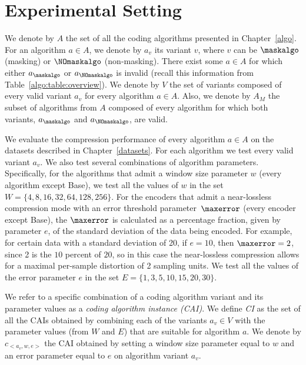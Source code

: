 
\clearpage
\section{Experimental Setting}
\label{experiments:experiments}


We denote by $A$ the set of all the coding algorithms presented in Chapter~\ref{algo}. For an algorithm $a \in A$, we denote by $a_v$ its variant $v$, where $v$ can be $\maskalgo$ (masking) or $\NOmaskalgo$ (non-masking). There exist some $a \in A$ for which either $a_\maskalgo$ or $a_\NOmaskalgo$ is invalid (recall this information from Table~\ref{algo:table:overview}). We denote by $V$ the set of variants composed of every valid variant $a_v$ for every algorithm $a \in A$. 
Also, we denote by $A_M$ the subset of algorithms from $A$ composed of every algorithm for which both variants, $a_\maskalgo$ and $a_\NOmaskalgo$, are valid.


We evaluate the compression performance of every algorithm $a \in A$ on the datasets described in Chapter~\ref{datasets}. For each algorithm we test every valid variant $a_v$. We also test several combinations of algorithm parameters. Specifically, for the algorithms that admit a window size parameter $w$ (every algorithm except Base), we test all the values of $w$ in the set $W = \{4, 8, 16, 32, 64, 128, 256\}$. For the encoders that admit a near-lossless compression mode with an error threshold parameter~$\maxerror$ (every encoder except Base), the $\maxerror$ is calculated as a percentage fraction, given by parameter $e$, of the standard deviation of the data being encoded. For example, for certain data with a standard deviation of 20, if $e=10$, then $\maxerror=2$, since 2 is the $10$ percent of $20$, so in this case the near-lossless compression allows for a maximal per-sample distortion of 2 sampling units. We test all the values of the error parameter $e$ in the set $E= \{1, 3, 5, 10, 15, 20, 30\}$. 


\vspace{+5pt}
\begin{defcion}
We refer to a specific combination of a coding algorithm variant and its parameter values as a \textit{coding algorithm instance (CAI)}. We define \textit{CI} as the set of all the CAIs obtained by combining each of the variants $a_v \in V$ with the parameter values (from $W$ and $E$) that are suitable for algorithm $a$. We denote by $c_{<a_v, w, e>}$ the CAI obtained by setting a window size parameter equal to $w$ and an error parameter equal to $e$ on algorithm variant $a_v$.
\end{defcion}


